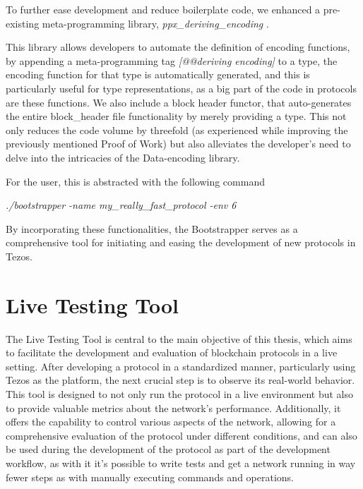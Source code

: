 To further ease development and reduce boilerplate code, we enhanced a pre-existing meta-programming library, \textit{ppx\_deriving\_encoding} \cite{ppx_deriving_encoding}. 

This library allows developers to automate the definition of encoding functions, by appending a meta-programming tag \textit{[@@deriving encoding]} to a type, the encoding function for that type is automatically generated, and this is particularly useful for type representations, as a big part of the code in protocols are these functions.
We also include a block header functor, that auto-generates the entire block\_header file functionality by merely providing a type.
This not only reduces the code volume by threefold (as experienced while improving the previously mentioned Proof of Work) but also alleviates the developer's need to delve into the intricacies of the Data-encoding library.





For the user, this is abstracted with the following command

\textit{./bootstrapper -name my\_really\_fast\_protocol -env 6}





By incorporating these functionalities, the Bootstrapper serves as a comprehensive tool for initiating and easing the development of new protocols in Tezos.





\section{Live Testing Tool}

The Live Testing Tool is central to the main objective of this thesis, which aims to facilitate the development and evaluation of blockchain protocols in a live setting. After developing a protocol in a standardized manner, particularly using Tezos as the platform, the next crucial step is to observe its real-world behavior. This tool is designed to not only run the protocol in a live environment but also to provide valuable metrics about the network's performance. Additionally, it offers the capability to control various aspects of the network, allowing for a comprehensive evaluation of the protocol under different conditions, and can also be used during the development of the protocol as part of the development workflow, as with it it's possible to write tests and get a network running in way fewer steps as with manually executing commands and operations.


